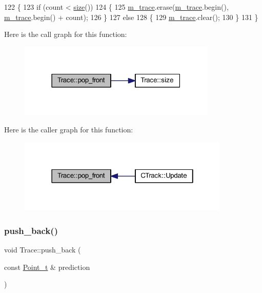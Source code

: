 \begin{DoxyCode}
122     \{
123         \textcolor{keywordflow}{if} (count < \mbox{\hyperlink{class_trace_a1bc7111ffb39ba415c2553677fc2f3ba}{size}}())
124         \{
125             \mbox{\hyperlink{class_trace_a2650850103966a19b5cbac6db8df8b66}{m\_trace}}.erase(\mbox{\hyperlink{class_trace_a2650850103966a19b5cbac6db8df8b66}{m\_trace}}.begin(), \mbox{\hyperlink{class_trace_a2650850103966a19b5cbac6db8df8b66}{m\_trace}}.begin() + count);
126         \}
127         \textcolor{keywordflow}{else}
128         \{
129             \mbox{\hyperlink{class_trace_a2650850103966a19b5cbac6db8df8b66}{m\_trace}}.clear();
130         \}
131     \}
\end{DoxyCode}
Here is the call graph for this function\+:\nopagebreak
\begin{figure}[H]
\begin{center}
\leavevmode
\includegraphics[width=267pt]{class_trace_a407c1b44333105aff314ae6f7f0ab7eb_cgraph}
\end{center}
\end{figure}
Here is the caller graph for this function\+:\nopagebreak
\begin{figure}[H]
\begin{center}
\leavevmode
\includegraphics[width=286pt]{class_trace_a407c1b44333105aff314ae6f7f0ab7eb_icgraph}
\end{center}
\end{figure}
\mbox{\label{class_trace_a5bca62bb3439cd12991f848a875d4085}} 
\subsubsection{\texorpdfstring{push\+\_\+back()}{push\_back()}\hspace{0.1cm}{\footnotesize\ttfamily [1/2]}}
{\footnotesize\ttfamily void Trace\+::push\+\_\+back (\begin{DoxyParamCaption}\item[{const \mbox{\hyperlink{defines_8h_a8c42696da8f098b91374a8e8bb84b430}{Point\+\_\+t}} \&}]{prediction }\end{DoxyParamCaption})\hspace{0.3cm}{\ttfamily [inline]}}



